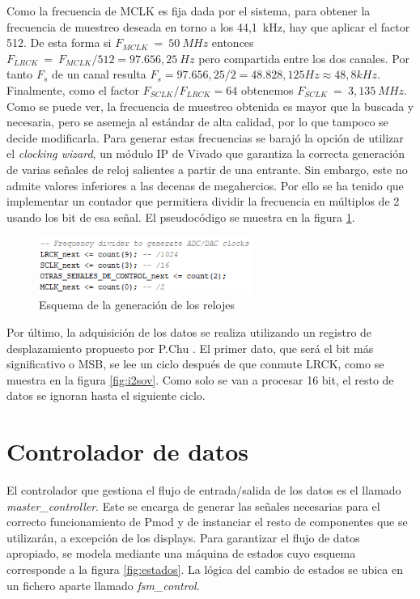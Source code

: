 Como la frecuencia de MCLK es fija dada por el sistema, para obtener la frecuencia de muestreo deseada en torno a los 44,1~kHz, hay que aplicar el factor 512. De esta forma si $F_{MCLK}~=~50~MHz$ entonces $F_{LRCK}~=~F_{MCLK}/512 = 97.656,25~Hz$ pero compartida entre los dos canales. Por tanto $F_{s}$ de un canal resulta $F_{s} = 97.656,25/2 = 48.828,125 Hz \approx 48,8 kHz$. Finalmente, como el factor $F_{SCLK}/F_{LRCK}=64$ obtenemos $F_{SCLK}~=~3,135~MHz$. Como se puede ver, la frecuencia de muestreo obtenida es mayor que la buscada y necesaria, pero se asemeja al estándar de alta calidad, por lo que tampoco se decide modificarla. Para generar estas frecuencias se barajó la opción de utilizar el \emph{clocking wizard}, un módulo IP de Vivado que garantiza la correcta generación de varias señales de reloj salientes a partir de una entrante. Sin embargo, este no admite valores inferiores a las decenas de megahercios. Por ello se ha tenido que implementar un contador que permitiera dividir la frecuencia en múltiplos de 2 usando los bit de esa señal. El pseudocódigo se muestra en la figura \ref{fig:controlsig}.

\begin{figure}[!h]
\begin{center}
\includegraphics[width=7cm]{img/controlsig.png}
\caption{\label{fig:controlsig}Esquema de la generación de los relojes}
\end{center}
\end{figure}

Por último, la adquisición de los datos se realiza utilizando un registro de desplazamiento propuesto por P.Chu \cite{vhdlchu}. El primer dato, que será el bit más significativo o MSB, se lee un ciclo después de que conmute LRCK, como se muestra en la figura \ref{fig:i2sov}. Como solo se van a procesar 16 bit, el resto de datos se ignoran hasta el siguiente ciclo.

\section{Controlador de datos}

El controlador que gestiona el flujo de entrada/salida de los datos es el llamado \emph{master\_controller}. Este se encarga de generar las señales necesarias para el correcto funcionamiento de Pmod y de instanciar el resto de componentes que se utilizarán, a excepción de los displays. Para garantizar el flujo de datos apropiado, se modela mediante una máquina de estados cuyo esquema corresponde a la figura \ref{fig:estados}. La lógica del cambio de estados se ubica en un fichero aparte llamado \emph{fsm\_control}.


